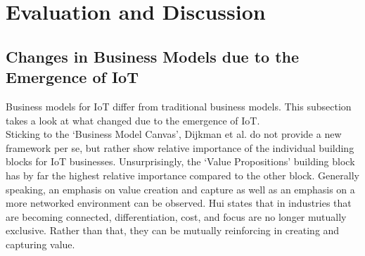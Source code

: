 \section{Evaluation and Discussion}
\label{sec:eval}
\vspace{-1em}
	\subsection{Changes in Business Models due to the Emergence of IoT}
	\vspace{-1em}
		Business models for IoT differ from traditional business models. This subsection takes a look at what changed due to the emergence of IoT.\\
		Sticking to the `Business Model Canvas', Dijkman et al. \cite{dijkman} do not provide a new framework per se, but rather show relative importance of the individual building blocks for IoT businesses. Unsurprisingly, the `Value Propositions' building block has by far the highest relative importance compared to the other block. Generally speaking, an emphasis on value creation and capture as well as an emphasis on a more networked environment can be observed. Hui \cite{hui} states that in industries that are becoming connected, differentiation, cost, and focus are no longer mutually exclusive. Rather than that, they can be mutually reinforcing in creating and capturing value.\\
